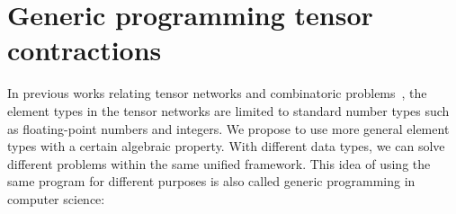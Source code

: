 \documentclass[onefignum, onetabnum]{siamart190516}
\newcommand{\<}{\langle}
\renewcommand{\>}{\rangle}
\newcommand{\blue}[1]{[{\bf  \color{blue}{JG: #1}}]}
\newcommand{\purple}[1]{[{\bf  \color{purple}{MC: #1}}]}
\newcounter{example}
\begin{document}
\section{Generic programming tensor contractions}\label{sec:generic}
In previous works relating tensor networks and combinatoric problems~\cite{Kourtis2019, Biamonte2017}, the element types in the tensor networks are limited to standard number types such as floating-point numbers and integers.
We propose to use more general element types with a certain algebraic property.
With different data types, we can solve different problems within the same unified framework.
This idea of using the same program for different purposes is also called generic programming in computer science:
\end{document}
